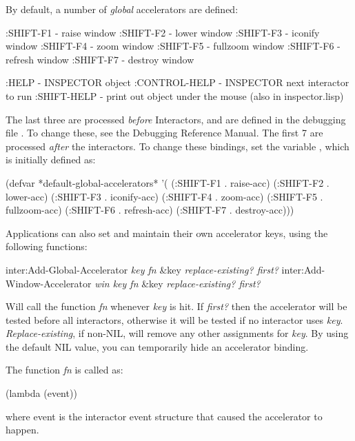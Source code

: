 By default, a number of {\it global} accelerators are defined:
\begin{programexample}
    :SHIFT-F1 -  raise window
    :SHIFT-F2 -  lower window
    :SHIFT-F3 -  iconify window
    :SHIFT-F4 -  zoom window
    :SHIFT-F5 -  fullzoom window
    :SHIFT-F6 -  refresh window
    :SHIFT-F7 -  destroy window

    :HELP - INSPECTOR object
    :CONTROL-HELP - INSPECTOR next interactor to run
    :SHIFT-HELP - print out object under the mouse (also in inspector.lisp)
\end{programexample}

The last three are processed {\it before} Interactors, and are defined
in the debugging file .
To change these, see the Debugging Reference Manual.
The first 7 are processed {\it after} the interactors.  To change these
bindings, set the variable , which
is initially defined as:
\begin{programexample}
(defvar *default-global-accelerators* '(
    (:SHIFT-F1 .  raise-acc)
    (:SHIFT-F2 .  lower-acc)
    (:SHIFT-F3 .  iconify-acc)
    (:SHIFT-F4 .  zoom-acc)
    (:SHIFT-F5 .  fullzoom-acc)
    (:SHIFT-F6 .  refresh-acc)
    (:SHIFT-F7 .  destroy-acc)))
\end{programexample}

Applications can also set and maintain their own accelerator keys,
using the following functions:
\begin{programexample}
inter:Add-Global-Accelerator {\it key fn} \&key {\it replace-existing? first?} \value{function}
inter:Add-Window-Accelerator {\it win key fn} \&key {\it replace-existing? first?} \value{function}
\end{programexample}

Will call the function {\it fn} whenever {\it key} is hit.  If {\it first?}
then the accelerator will be tested before all interactors, otherwise
it will be tested if no interactor uses {\it key}.
{\it Replace-existing}, if non-NIL, will remove any other assignments
for {\it key}.  By using the default NIL value, you can temporarily hide
an accelerator binding.

\vspace{1 line}
\begin{group}
The function {\it fn} is called as:
\begin{programexample}
(lambda (event))
\end{programexample}
where event is the interactor event structure that caused the
accelerator to happen.
\end{group}

